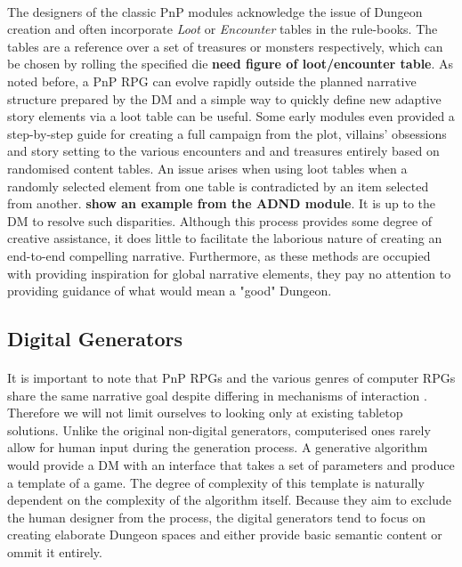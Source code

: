 \documentclass{UoYCSproject}
\begin{document}
\paragraph{}
The designers of the classic PnP modules acknowledge the issue of Dungeon creation and often incorporate \textit{Loot} or \textit{Encounter} tables in the rule-books. The tables are a reference over a set of treasures or monsters respectively, which can be chosen by rolling the specified die \textbf{need figure of loot/encounter table}. As noted before, a PnP RPG can evolve rapidly outside the planned narrative structure prepared by the DM and a simple way to quickly define new adaptive story elements via a loot table can be useful. Some early modules even provided a step-by-step guide for creating a full campaign from the plot, villains' obsessions and story setting to the various encounters and and treasures \parencite{ADnD} entirely based on randomised content tables. An issue arises when using loot tables when a randomly selected element from one table is contradicted by an item selected from another. \textbf{show an example from the ADND module}. It is up to the DM to resolve such disparities. Although this process provides some degree of creative assistance, it does little to facilitate the laborious nature of creating an end-to-end compelling narrative. Furthermore, as these methods are occupied with providing inspiration for global narrative elements, they pay no attention to providing guidance of what would mean a "good" Dungeon.

\subsection{Digital Generators}
\label{subsec:DigGen}
\paragraph{}
It is important to note that PnP RPGs and the various genres of computer RPGs share the same narrative goal despite differing in mechanisms of interaction \parencite{Tychsen2006}. Therefore we will not limit ourselves to looking only at existing tabletop solutions.
Unlike the original non-digital generators, computerised ones rarely allow for human input during the generation process. A generative algorithm would provide a DM with an interface that takes a set of parameters and produce a template of a game. The degree of complexity of this template is naturally dependent on the complexity of the algorithm itself. Because they aim to exclude the human designer from the process, the digital generators tend to focus on creating elaborate Dungeon spaces and either provide basic semantic content or ommit it entirely.
\end{document}
